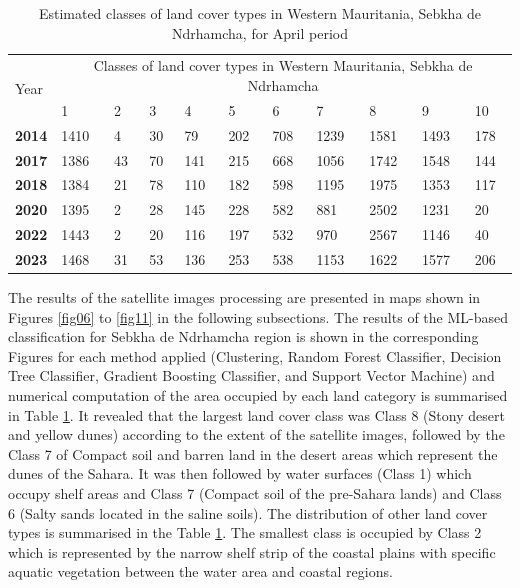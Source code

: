 \documentclass[12pt,a4paper,oneside]{article}
\begin{document}
\begin{table}[H]
\caption{Estimated classes of land cover types in Western Mauritania, Sebkha de Ndrhamcha, for April period}
  \centering
  \begin{tabularx}{\textwidth}{p{0.9cm}p{0.9cm}p{0.9cm}p{0.9cm}p{0.9cm}p{0.9cm}p{0.9cm}p{0.9cm}p{0.9cm}p{0.9cm}p{0.9cm}}
  \toprule
  \multirow{2}{*}{Year} & \multicolumn{10}{c}{Classes of land cover types in Western Mauritania, Sebkha de Ndrhamcha} \\
     & 1 & 2 & 3 & 4 & 5 & 6 & 7 & 8 & 9 & 10 \\
    \midrule
    \textbf{2014} & 1410 & 4 & 30 & 79 & 202 & 708 & 1239 & 1581 & 1493 & 178 \\
    
    \textbf{2017} & 1386 & 43 & 70 & 141 & 215 & 668 & 1056 & 1742 & 1548 & 144 \\
    \textbf{2018} & 1384 & 21 & 78 & 110 & 182 & 598 & 1195 & 1975 & 1353 & 117 \\
    \textbf{2020} & 1395 & 2 & 28 & 145 & 228 & 582 & 881 & 2502 & 1231 & 20 \\
    \textbf{2022} & 1443 & 2 & 20 & 116 & 197 & 532 & 970 & 2567 & 1146 & 40 \\
    \textbf{2023} & 1468 & 31 & 53 & 136 & 253 & 538 & 1153 & 1622 & 1577 & 206 \\
\bottomrule
\end{tabularx}
  \label{tab3}
\end{table}

The results of the satellite images processing are presented in maps shown in Figures \ref{fig06} to \ref{fig11} in the following subsections. The results of the ML-based classification for Sebkha de Ndrhamcha region  is shown in the corresponding Figures for each method applied (Clustering, Random Forest Classifier, Decision Tree Classifier, Gradient Boosting Classifier, and Support Vector Machine) and numerical computation of the area occupied by each land category is summarised in Table \ref{tab3}. It revealed that the largest land cover class was Class 8 (Stony desert and yellow dunes) according to the extent of the satellite images, followed by the Class 7 of Compact soil and barren land in the desert areas which represent the dunes of the Sahara. It was then followed by water surfaces (Class 1) which occupy shelf areas and Class 7 (Compact soil of the pre-Sahara lands) and Class 6 (Salty sands located in the saline soils). The distribution of other land cover types is summarised in the Table \ref{tab3}. The smallest class is occupied by Class 2 which is represented by the narrow shelf strip of the coastal plains with specific aquatic vegetation between the water area and coastal regions. 
\end{document}
